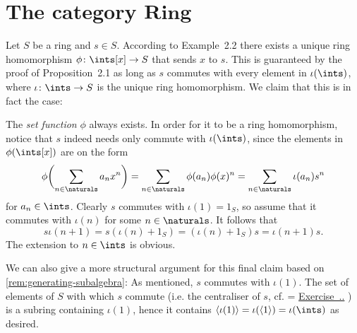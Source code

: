 \documentclass[article, a4paper, 11pt, oneside]{memoir}
\numberwithin{equation}{chapter}
\DeclarePairedDelimiter{\gen}{\langle}{\rangle} %
\newcommand{\ncat}[1]{\mathbf{#1}} %
\newcommand{\catRing}{\ncat{Ring}} %
\newcommand{\RNum}[1]{\uppercase\expandafter{\romannumeral #1\relax}}
\newcommand{\exref}[1]{%
    \setsepchar{.}%
    \readlist*\mylist{#1}%
    \ifnum \arabic{chapter}=\mylist[1]
        \def\mylabel{\mylist[2].\mylist[3]}%
    \else
        \def\mylabel{\RNum{\mylist[1]}.\mylist[2].\mylist[3]}%
    \fi
    \hyperref[ex:#1]{Exercise~\mylabel}%
}
\theoremstyle{nonumberplain}
\begin{document}
\section[The category Ring][The category $\catRing$]{The category $\catRing$}

\begin{remark*}
    Let $S$ be a ring and $s \in S$. According to Example~2.2 there exists a unique ring homomorphism $\phi \colon \ints[x] \to S$ that sends $x$ to $s$. This is guaranteed by the proof of Proposition~2.1 as long as $s$ commutes with every element in $\iota(\ints)$, where $\iota \colon \ints \to S$ is the unique ring homomorphism. We claim that this is in fact the case:
    
    The \emph{set function} $\phi$ always exists. In order for it to be a ring homomorphism, notice that $s$ indeed needs only commute with $\iota(\ints)$, since the elements in $\phi(\ints[x])$ are on the form
    \begin{equation*}
        \phi \biggl( \sum_{n \in \naturals} a_n x^n \biggr)
            = \sum_{n \in \naturals} \phi(a_n) \phi(x)^n
            = \sum_{n \in \naturals} \iota(a_n) s^n
    \end{equation*}
    for $a_n \in \ints$. Clearly $s$ commutes with $\iota(1) = 1_S$, so assume that it commutes with $\iota(n)$ for some $n \in \naturals$. It follows that
    \begin{equation*}
        s \iota(n+1)
            = s(\iota(n) + 1_S)
            = (\iota(n) + 1_S)s
            = \iota(n+1)s.
    \end{equation*}
    The extension to $n \in \ints$ is obvious.

    We can also give a more structural argument for this final claim based on \cref{rem:generating-subalgebra}: As mentioned, $s$ commutes with $\iota(1)$. The set of elements of $S$ with which $s$ commute (i.e. the centraliser of $s$, cf. \exref{3.2.10}) is a subring containing $\iota(1)$, hence it contains $\gen{\iota(1)} = \iota(\gen{1}) = \iota(\ints)$ as desired.
\end{remark*}
\end{document}
